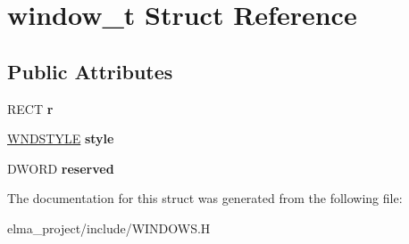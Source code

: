 \hypertarget{structwindow__t}{}\section{window\+\_\+t Struct Reference}
\label{structwindow__t}
\subsection*{Public Attributes}
\begin{DoxyCompactItemize}
\item 
\mbox{\label{structwindow__t_a188d7fbaf1216e95ff5424f5b1a9620c}} 
R\+E\+CT {\bfseries r}
\item 
\mbox{\label{structwindow__t_ab8af5a4f9475633627a2156132086bdd}} 
\mbox{\hyperlink{struct_w_n_d_s_t_y_l_e}{W\+N\+D\+S\+T\+Y\+LE}} {\bfseries style}
\item 
\mbox{\label{structwindow__t_af9834d2dd664f87159bdb2407c6e6328}} 
D\+W\+O\+RD {\bfseries reserved}
\end{DoxyCompactItemize}


The documentation for this struct was generated from the following file\+:\begin{DoxyCompactItemize}
\item 
elma\+\_\+project/include/W\+I\+N\+D\+O\+W\+S.\+H\end{DoxyCompactItemize}
